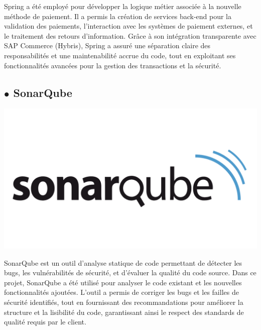 Spring a été employé pour développer la logique métier associée à la nouvelle méthode de paiement. Il a permis la création de services back-end pour la validation des paiements, l'interaction avec les systèmes de paiement externes, et le traitement des retours d'information. Grâce à son intégration transparente avec SAP Commerce (Hybris), Spring a assuré une séparation claire des responsabilités et une maintenabilité accrue du code, tout en exploitant ses fonctionnalités avancées pour la gestion des transactions et la sécurité.
\subsection*{$\bullet$ SonarQube}
 \begin{center}
    \centering
    \includegraphics[scale=0.15]{Figures/sonarqube.png}
    \label{fig:processus}
\end{center} 

SonarQube est un outil d'analyse statique de code permettant de détecter les bugs, les vulnérabilités de sécurité, et d'évaluer la qualité du code source. Dans ce projet, SonarQube a été utilisé pour analyser le code existant et les nouvelles fonctionnalités ajoutées. L'outil a permis de corriger les bugs et les failles de sécurité identifiés, tout en fournissant des recommandations pour améliorer la structure et la lisibilité du code, garantissant ainsi le respect des standards de qualité requis par le client.

